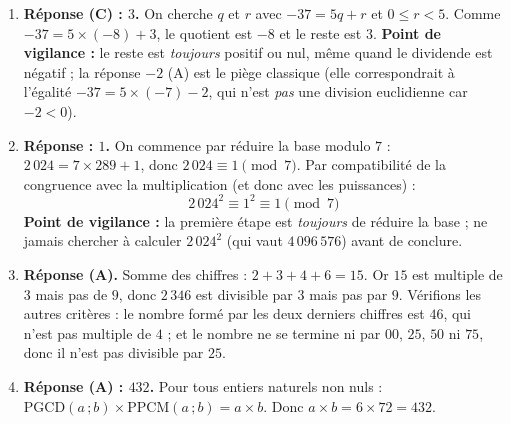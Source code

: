 \documentclass[11pt]{article}
\begin{document}
\begin{corrige}
\begin{enumerate}
\item \textbf{Réponse (C) : $3$.} On cherche $q$ et $r$ avec $-37 = 5q + r$ et $0 \le r < 5$. Comme $-37 = 5 \times (-8) + 3$, le quotient est $-8$ et le reste est $3$. \textbf{Point de vigilance :} le reste est \emph{toujours} positif ou nul, même quand le dividende est négatif ; la réponse $-2$ (A) est le piège classique (elle correspondrait à l'égalité $-37 = 5 \times (-7) - 2$, qui n'est \emph{pas} une division euclidienne car $-2 < 0$).
\item \textbf{Réponse : $1$.} On commence par réduire la base modulo $7$ : $2\,024 = 7 \times 289 + 1$, donc $2\,024 \equiv 1 \pmod{7}$. Par compatibilité de la congruence avec la multiplication (et donc avec les puissances) :
\[ 2\,024^2 \equiv 1^2 \equiv 1 \pmod{7} \]
\textbf{Point de vigilance :} la première étape est \emph{toujours} de réduire la base ; ne jamais chercher à calculer $2\,024^2$ (qui vaut $4\,096\,576$) avant de conclure.
\item \textbf{Réponse (A).} Somme des chiffres : $2+3+4+6 = 15$. Or $15$ est multiple de $3$ mais pas de $9$, donc $2\,346$ est divisible par $3$ mais pas par $9$. Vérifions les autres critères : le nombre formé par les deux derniers chiffres est $46$, qui n'est pas multiple de $4$ ; et le nombre ne se termine ni par $00$, $25$, $50$ ni $75$, donc il n'est pas divisible par $25$.
\item \textbf{Réponse (A) : $432$.} Pour tous entiers naturels non nuls : $\mathrm{PGCD}(a\,;b) \times \mathrm{PPCM}(a\,;b) = a \times b$. Donc $a \times b = 6 \times 72 = 432$.
\end{enumerate}
\end{corrige}
\end{document}
